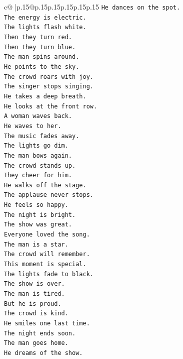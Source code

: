 \documentclass{article}
\begin{document}
{\begin{supertabular}{c@{$\;$}|p{.15\linewidth}@{}p{.15\linewidth}p{.15\linewidth}p{.15\linewidth}p{.15\linewidth}p{.15\linewidth}}
{{{\texttt{He dances on the spot.} \\
\texttt{The energy is electric.} \\
\texttt{The lights flash white.} \\
\texttt{Then they turn red.} \\
\texttt{Then they turn blue.} \\
\texttt{The man spins around.} \\
\texttt{He points to the sky.} \\
\texttt{The crowd roars with joy.} \\
\texttt{The singer stops singing.} \\
\texttt{He takes a deep breath.} \\
\texttt{He looks at the front row.} \\
\texttt{A woman waves back.} \\
\texttt{He waves to her.} \\
\texttt{The music fades away.} \\
\texttt{The lights go dim.} \\
\texttt{The man bows again.} \\
\texttt{The crowd stands up.} \\
\texttt{They cheer for him.} \\
\texttt{He walks off the stage.} \\
\texttt{The applause never stops.} \\
\texttt{He feels so happy.} \\
\texttt{The night is bright.} \\
\texttt{The show was great.} \\
\texttt{Everyone loved the song.} \\
\texttt{The man is a star.} \\
\texttt{The crowd will remember.} \\
\texttt{This moment is special.} \\
\texttt{The lights fade to black.} \\
\texttt{The show is over.} \\
\texttt{The man is tired.} \\
\texttt{But he is proud.} \\
\texttt{The crowd is kind.} \\
\texttt{He smiles one last time.} \\
\texttt{The night ends soon.} \\
\texttt{The man goes home.} \\
\texttt{He dreams of the show.} \\
}}}
\end{supertabular}}
\end{document}
